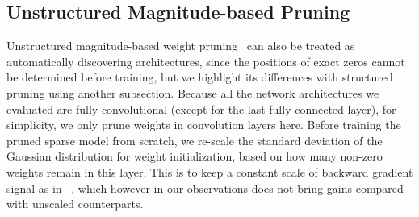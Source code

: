 \subsection{Unstructured Magnitude-based Pruning}
\label{sec:unstructured}
Unstructured magnitude-based weight pruning~\cite{han2015learning} can also be treated as automatically discovering architectures, since the positions of exact zeros cannot be determined before training, but we highlight its differences with structured pruning using another subsection. 
Because all the network architectures we evaluated are fully-convolutional (except for the last fully-connected layer), for simplicity, we only prune weights in convolution layers here. Before training the pruned sparse model from scratch, we re-scale the standard deviation of the Gaussian distribution for weight initialization, based on how many non-zero weights remain in this layer. This is to keep a constant scale of backward gradient signal as in ~\cite{he2015delving}, which however in our observations does not bring gains compared with unscaled counterparts.



